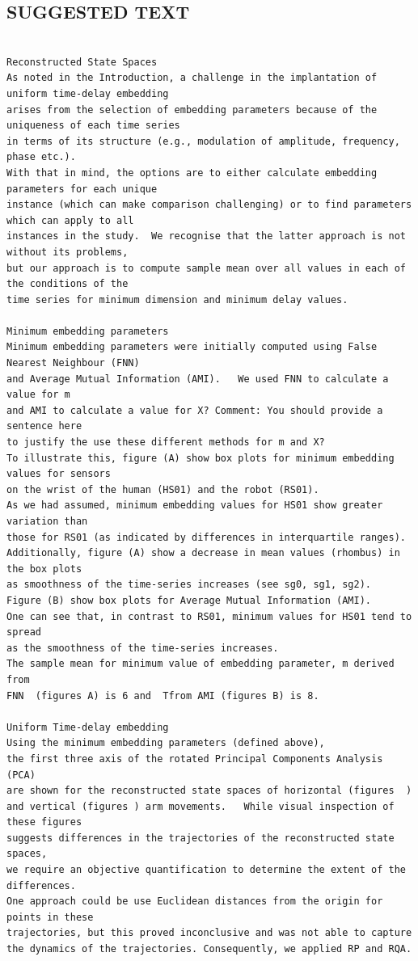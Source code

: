 \documentclass[10pt]{article}
\begin{document}
\subsection{SUGGESTED TEXT}
\begin{verbatim}

Reconstructed State Spaces
As noted in the Introduction, a challenge in the implantation of uniform time-delay embedding 
arises from the selection of embedding parameters because of the uniqueness of each time series 
in terms of its structure (e.g., modulation of amplitude, frequency, phase etc.). 
With that in mind, the options are to either calculate embedding parameters for each unique 
instance (which can make comparison challenging) or to find parameters which can apply to all 
instances in the study.  We recognise that the latter approach is not without its problems, 
but our approach is to compute sample mean over all values in each of the conditions of the 
time series for minimum dimension and minimum delay values.

Minimum embedding parameters
Minimum embedding parameters were initially computed using False Nearest Neighbour (FNN) 
and Average Mutual Information (AMI).   We used FNN to calculate a value for m 
and AMI to calculate a value for X? Comment: You should provide a sentence here 
to justify the use these different methods for m and X? 
To illustrate this, figure (A) show box plots for minimum embedding values for sensors 
on the wrist of the human (HS01) and the robot (RS01).   
As we had assumed, minimum embedding values for HS01 show greater variation than 
those for RS01 (as indicated by differences in interquartile ranges).  
Additionally, figure (A) show a decrease in mean values (rhombus) in the box plots 
as smoothness of the time-series increases (see sg0, sg1, sg2).  
Figure (B) show box plots for Average Mutual Information (AMI).  
One can see that, in contrast to RS01, minimum values for HS01 tend to spread 
as the smoothness of the time-series increases.
The sample mean for minimum value of embedding parameter, m derived from 
FNN  (figures A) is 6 and  Tfrom AMI (figures B) is 8.

Uniform Time-delay embedding
Using the minimum embedding parameters (defined above), 
the first three axis of the rotated Principal Components Analysis (PCA) 
are shown for the reconstructed state spaces of horizontal (figures  ) 
and vertical (figures ) arm movements.   While visual inspection of these figures 
suggests differences in the trajectories of the reconstructed state spaces, 
we require an objective quantification to determine the extent of the differences.  
One approach could be use Euclidean distances from the origin for points in these 
trajectories, but this proved inconclusive and was not able to capture 
the dynamics of the trajectories. Consequently, we applied RP and RQA.


\end{verbatim}
\end{document}

